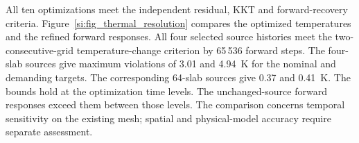 All ten optimizations meet the independent residual, KKT
and forward-recovery criteria. Figure~\ref{si:fig_thermal_resolution}
compares the optimized temperatures and the refined forward responses.
All four selected source histories meet the two-consecutive-grid
temperature-change criterion by 65\,536 forward steps.
The four-slab sources give maximum violations of 3.01 and
4.94~K for the nominal and demanding targets.
The corresponding 64-slab sources give 0.37 and 0.41~K.
The bounds hold at the optimization time levels.
The unchanged-source forward responses exceed them between those levels.
The comparison concerns temporal sensitivity on the existing mesh;
spatial and physical-model accuracy require separate assessment.

